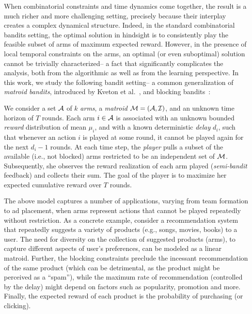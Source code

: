 When combinatorial constraints and time dynamics come together, the result is a much richer and more challenging setting, precisely because their interplay creates a complex dynamical structure. Indeed, in the standard combinatorial bandits setting, the optimal solution in hindsight is to consistently play the feasible subset of arms of maximum expected reward. However, in the presence of local temporal constraints on the arms, an optimal (or even suboptimal) solution cannot be trivially characterized-- a fact that significantly complicates the analysis, both from the algorithmic as well as from the learning perspective. In this work, we study %
the following bandit setting-- a common generalization of {\em matroid bandits}, introduced by Kveton et al.\
\cite{KWAEE14}, and blocking bandits~\cite{BSSS19}:

\begin{problem}
We consider a set $\operatorname{\mathcal{A}}$ of $k$ {\em arms}, a {\em matroid} $\operatorname{\mathcal{M}}=(\operatorname{\mathcal{A}},\operatorname{\mathcal{I}})$, and an unknown time horizon of $T$ rounds. Each arm $i \in \operatorname{\mathcal{A}}$ is associated with an unknown bounded {\em reward} distribution of mean $\mu_i$, and with a known deterministic {\em delay} $d_i$, such that whenever an action $i$ is played at some round, it cannot be played again for the next $d_i-1$ rounds. At each time step, the {\em player} pulls a subset of the available (i.e., not blocked) arms restricted to be an independent set of $\operatorname{\mathcal{M}}$. Subsequently, she observes the reward realization of each arm played ({\em semi-bandit} feedback) and collects their sum. The goal of the player is to maximize her expected cumulative reward over $T$ rounds.
\end{problem}
 
The above model captures a number of applications, varying from team formation to ad placement, when arms represent actions that cannot be played repeatedly without restriction. As a concrete example, consider a recommendation system that repeatedly suggests a variety of products (e.g., songs, movies, books) to a user. The need for diversity on the collection of suggested products (arms), to capture different aspects of user's preferences, can be modeled as a linear matroid. Further, the blocking constraints preclude the incessant recommendation of the same product (which can be detrimental, as the product might be perceived as a ``spam''), while the maximum rate of recommendation (controlled by the delay) might depend on factors such as popularity, promotion and more. Finally, the expected reward of each product is the probability of purchasing (or clicking).

